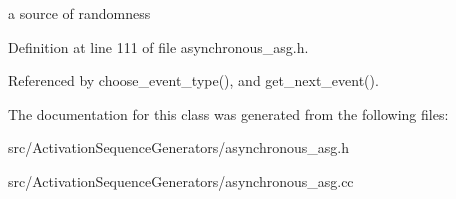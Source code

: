 a source of randomness 

Definition at line 111 of file asynchronous\_\-asg.h.

Referenced by choose\_\-event\_\-type(), and get\_\-next\_\-event().

The documentation for this class was generated from the following files:\begin{CompactItemize}
\item 
src/ActivationSequenceGenerators/asynchronous\_\-asg.h\item 
src/ActivationSequenceGenerators/asynchronous\_\-asg.cc\end{CompactItemize}
